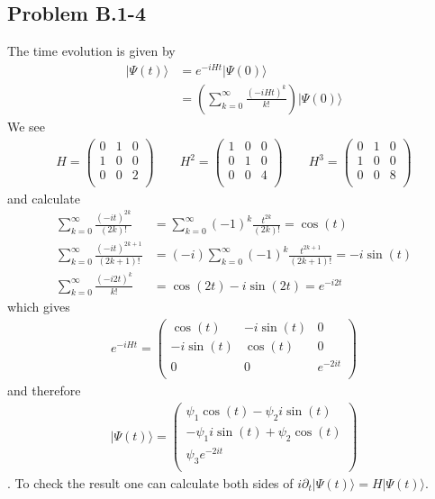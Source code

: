 \documentclass[10pt,a4paper]{book}
\theoremstyle{definition}
\begin{document}
\subsection{Problem B.1-4}
The time evolution is given by
\begin{align}
    |\Psi(t)\rangle&=e^{-iHt}|\Psi(0)\rangle\\
    &=\left(\sum_{k=0}^\infty\frac{(-iHt)^k}{k!}\right)|\Psi(0)\rangle
\end{align}
We see
\begin{align}
H=\left(
\begin{array}{ccc}
 0 & 1 & 0 \\
 1 & 0 & 0 \\
 0 & 0 & 2 \\
\end{array}
\right)\qquad
H^2=\left(
\begin{array}{ccc}
 1 & 0 & 0 \\
 0 & 1 & 0 \\
 0 & 0 & 4 \\
\end{array}
\right)
\qquad
H^3=\left(
\begin{array}{ccc}
 0 & 1 & 0 \\
 1 & 0 & 0 \\
 0 & 0 & 8 \\
\end{array}
\right)
\end{align}
and calculate
\begin{align}
    \sum_{k=0}^\infty\frac{(-it)^{2k}}{(2k)!}&=\sum_{k=0}^\infty(-1)^k \frac{t^{2k}}{(2k)!}=\cos(t)\\
    \sum_{k=0}^\infty\frac{(-it)^{2k+1}}{(2k+1)!}&=(-i)\sum_{k=0}^\infty(-1)^{k}\frac{t^{2k+1}}{(2k+1)!}=-i\sin(t)\\
    \sum_{k=0}^\infty\frac{(-i2t)^k}{k!}&=\cos(2t)-i\sin(2t)=e^{-i2t}
\end{align}
which gives
\begin{align}
    e^{-iHt}=\left(
\begin{array}{ccc}
 \cos (t) & -i \sin (t) & 0 \\
 -i \sin (t) & \cos (t) & 0 \\
 0 & 0 & e^{-2 i t} \\
\end{array}
\right)
\end{align}
and therefore
\begin{align}
|\Psi(t)\rangle=\left(
\begin{array}{ccc}
 \psi_1\cos (t)  -\psi_2i \sin (t) \\
 -\psi_1i \sin (t) + \psi_2\cos (t) \\
 \psi_3e^{-2 i t} \\
\end{array}
\right)
\end{align}.
To check the result one can calculate both sides of $i\partial_t|\Psi(t)\rangle=H|\Psi(t)\rangle$.
\end{document}

